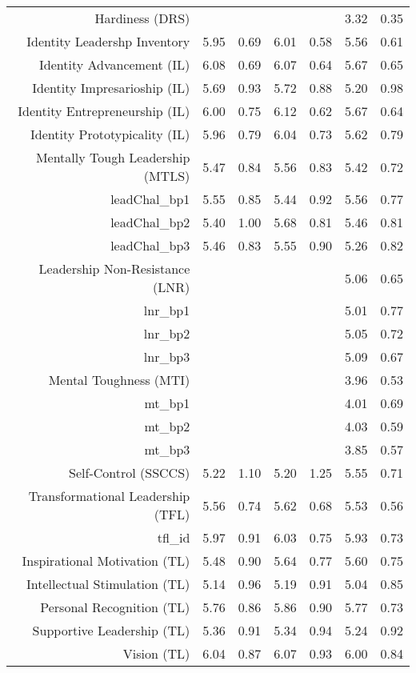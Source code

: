 \begin{table}[ht]
\begin{tabular}{rrrrrrr}
  Hardiness (DRS) &  &  &  &  & 3.32 & 0.35 \\ 
  Identity Leadershp Inventory & 5.95 & 0.69 & 6.01 & 0.58 & 5.56 & 0.61 \\ 
  Identity Advancement (IL) & 6.08 & 0.69 & 6.07 & 0.64 & 5.67 & 0.65 \\ 
  Identity Impresarioship (IL) & 5.69 & 0.93 & 5.72 & 0.88 & 5.20 & 0.98 \\ 
  Identity Entrepreneurship (IL) & 6.00 & 0.75 & 6.12 & 0.62 & 5.67 & 0.64 \\ 
  Identity Prototypicality (IL) & 5.96 & 0.79 & 6.04 & 0.73 & 5.62 & 0.79 \\ 
  Mentally Tough Leadership (MTLS) & 5.47 & 0.84 & 5.56 & 0.83 & 5.42 & 0.72 \\ 
  leadChal\_bp1 & 5.55 & 0.85 & 5.44 & 0.92 & 5.56 & 0.77 \\ 
  leadChal\_bp2 & 5.40 & 1.00 & 5.68 & 0.81 & 5.46 & 0.81 \\ 
  leadChal\_bp3 & 5.46 & 0.83 & 5.55 & 0.90 & 5.26 & 0.82 \\ 
  Leadership Non-Resistance (LNR) &  &  &  &  & 5.06 & 0.65 \\ 
  lnr\_bp1 &  &  &  &  & 5.01 & 0.77 \\ 
  lnr\_bp2 &  &  &  &  & 5.05 & 0.72 \\ 
  lnr\_bp3 &  &  &  &  & 5.09 & 0.67 \\ 
  Mental Toughness (MTI) &  &  &  &  & 3.96 & 0.53 \\ 
  mt\_bp1 &  &  &  &  & 4.01 & 0.69 \\ 
  mt\_bp2 &  &  &  &  & 4.03 & 0.59 \\ 
  mt\_bp3 &  &  &  &  & 3.85 & 0.57 \\ 
  Self-Control (SSCCS) & 5.22 & 1.10 & 5.20 & 1.25 & 5.55 & 0.71 \\ 
  Transformational Leadership (TFL) & 5.56 & 0.74 & 5.62 & 0.68 & 5.53 & 0.56 \\ 
  tfl\_id & 5.97 & 0.91 & 6.03 & 0.75 & 5.93 & 0.73 \\ 
  Inspirational Motivation (TL) & 5.48 & 0.90 & 5.64 & 0.77 & 5.60 & 0.75 \\ 
  Intellectual Stimulation (TL) & 5.14 & 0.96 & 5.19 & 0.91 & 5.04 & 0.85 \\ 
  Personal Recognition (TL) & 5.76 & 0.86 & 5.86 & 0.90 & 5.77 & 0.73 \\ 
  Supportive Leadership (TL) & 5.36 & 0.91 & 5.34 & 0.94 & 5.24 & 0.92 \\ 
  Vision (TL) & 6.04 & 0.87 & 6.07 & 0.93 & 6.00 & 0.84 \\ 

\end{tabular}
\end{table}
